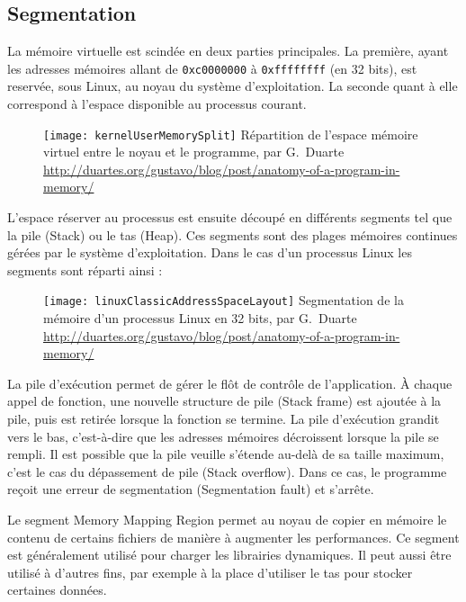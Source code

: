 \subsection{Segmentation}

La mémoire virtuelle est scindée en deux parties principales. La première, ayant les adresses mémoires allant de \texttt{0xc0000000} à \texttt{0xffffffff} (en 32 bits), est reservée, sous Linux, au noyau du système d'exploitation. La seconde quant à elle correspond à l'espace disponible au processus courant.

\begin{figure}[H]
	\centering
	\texttt{[image: kernelUserMemorySplit]}
	{Répartition de l'espace mémoire virtuel entre le noyau et le programme, par G.~Duarte}
	{\url{http://duartes.org/gustavo/blog/post/anatomy-of-a-program-in-memory/}}
	\label{fig:kernelUserMemorySplit}
\end{figure}

L'espace réserver au processus est ensuite découpé en différents segments tel que la pile (Stack) ou le tas (Heap). Ces segments sont des plages mémoires continues gérées par le système d'exploitation. Dans le cas d'un processus Linux les segments sont réparti ainsi :

\begin{figure}[H]
	\centering
	\texttt{[image: linuxClassicAddressSpaceLayout]}
	{Segmentation de la mémoire d'un processus Linux en 32 bits, par G.~Duarte}
	{\url{http://duartes.org/gustavo/blog/post/anatomy-of-a-program-in-memory/}}
	\label{fig:linuxClassicAddressSpaceLayout}
\end{figure}

\vfill

La pile d'exécution permet de gérer le flôt de contrôle de l'application. À chaque appel de fonction, une nouvelle structure de pile (Stack frame) est ajoutée à la pile, puis est retirée lorsque la fonction se termine. La pile d'exécution grandit vers le bas, c'est-à-dire que les adresses mémoires décroissent lorsque la pile se rempli. Il est possible que la pile veuille s'étende au-delà de sa taille maximum, c'est le cas du dépassement de pile (Stack overflow). Dans ce cas, le programme reçoit une erreur de segmentation (Segmentation fault) et s'arrête.

Le segment \og Memory Mapping Region \fg permet au noyau de copier en mémoire le contenu de certains fichiers de manière à augmenter les performances. Ce segment est généralement utilisé pour charger les librairies dynamiques. Il peut aussi être utilisé à d'autres fins, par exemple à la place d'utiliser le tas pour stocker certaines données.

